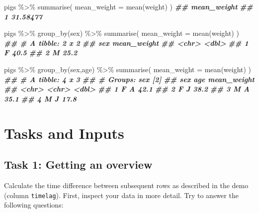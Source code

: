 \documentclass[
]{book}
\newenvironment{Shaded}{\begin{snugshade}}{\end{snugshade}}
\newcommand{\AttributeTok}[1]{\textcolor[rgb]{0.77,0.63,0.00}{#1}}
\newcommand{\DocumentationTok}[1]{\textcolor[rgb]{0.56,0.35,0.01}{\textbf{\textit{#1}}}}
\newcommand{\FunctionTok}[1]{\textcolor[rgb]{0.00,0.00,0.00}{#1}}
\newcommand{\NormalTok}[1]{#1}
\newcommand{\SpecialCharTok}[1]{\textcolor[rgb]{0.00,0.00,0.00}{#1}}
\begin{document}
\begin{Shaded}
\begin{Highlighting}[]
\NormalTok{pigs }\SpecialCharTok{\%\textgreater{}\%}
    \FunctionTok{summarise}\NormalTok{(         }
    \AttributeTok{mean\_weight =} \FunctionTok{mean}\NormalTok{(weight)}
\NormalTok{  )}
\DocumentationTok{\#\#   mean\_weight}
\DocumentationTok{\#\# 1    31.58477}

\NormalTok{pigs }\SpecialCharTok{\%\textgreater{}\%}
  \FunctionTok{group\_by}\NormalTok{(sex) }\SpecialCharTok{\%\textgreater{}\%}
  \FunctionTok{summarise}\NormalTok{(         }
    \AttributeTok{mean\_weight =} \FunctionTok{mean}\NormalTok{(weight)}
\NormalTok{  )}
\DocumentationTok{\#\# \# A tibble: 2 x 2}
\DocumentationTok{\#\#   sex   mean\_weight}
\DocumentationTok{\#\#   \textless{}chr\textgreater{}       \textless{}dbl\textgreater{}}
\DocumentationTok{\#\# 1 F            40.5}
\DocumentationTok{\#\# 2 M            25.2}

\NormalTok{pigs }\SpecialCharTok{\%\textgreater{}\%}
  \FunctionTok{group\_by}\NormalTok{(sex,age) }\SpecialCharTok{\%\textgreater{}\%}
  \FunctionTok{summarise}\NormalTok{(         }
    \AttributeTok{mean\_weight =} \FunctionTok{mean}\NormalTok{(weight)}
\NormalTok{  )}
\DocumentationTok{\#\# \# A tibble: 4 x 3}
\DocumentationTok{\#\# \# Groups:   sex [2]}
\DocumentationTok{\#\#   sex   age   mean\_weight}
\DocumentationTok{\#\#   \textless{}chr\textgreater{} \textless{}chr\textgreater{}       \textless{}dbl\textgreater{}}
\DocumentationTok{\#\# 1 F     A            42.1}
\DocumentationTok{\#\# 2 F     J            38.2}
\DocumentationTok{\#\# 3 M     A            35.1}
\DocumentationTok{\#\# 4 M     J            17.8}
\end{Highlighting}
\end{Shaded}

\hypertarget{tasks-and-inputs-1}{%
\section{Tasks and Inputs}\label{tasks-and-inputs-1}}

\hypertarget{task-1-getting-an-overview}{%
\subsection{Task 1: Getting an overview}\label{task-1-getting-an-overview}}

Calculate the time difference between subsequent rows as described in the demo (column \texttt{timelag}).
First, inspect your data in more detail. Try to answer the following questions:
\end{document}
